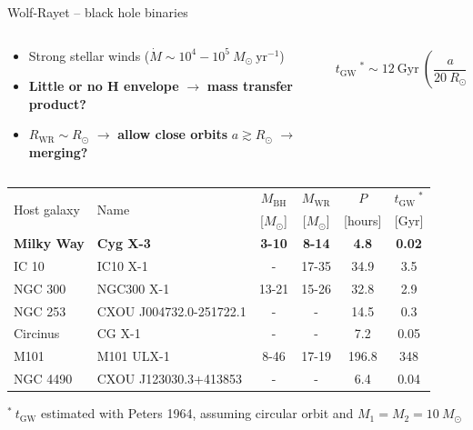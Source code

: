 \documentclass{beamer} %
\begin{document}
\begin{frame}{Wolf-Rayet -- black hole binaries}
	\scriptsize
	\begin{columns}
		\begin{column}{0.72\textwidth}
			\begin{itemize}
				\item Strong stellar winds ($\dot{M} \sim 10^4-10^5~M_\odot~\text{yr}^{-1}$)
				\item \textbf{Little or no H envelope} $\rightarrow$ \textbf{mass transfer product?}
				\item $R_{\text{WR}} \sim R_\odot$ $\rightarrow$ \textbf{allow close orbits} $a \gtrsim R_\odot$ $\rightarrow$ \textbf{merging?}
			\end{itemize}
		\end{column}
		\begin{column}{0.34\textwidth}
			\centering
			\[t_{\text{GW}}~^* \sim 12~\text{Gyr}~\left(\frac{a}{20~ R_\odot}\right)^4\]
		\end{column}
	\end{columns}
	\bigskip

	\centering
	\bigskip
	
	\begin{threeparttable}
	\begin{tabular}{llcccc}
		\toprule
		\multirow{2}{*}{Host galaxy} & \multirow{2}{*}{Name} & $M_{\text{BH}}$ & $M_{\text{WR}}$ & $P$ & $t_{\text{GW}}~^*$ \\
		& & [$M_\odot$] & [$M_\odot$] & [hours] & [Gyr] \\
		\midrule
		\textbf{Milky Way} & \textbf{Cyg X-3} & \textbf{3-10} & \textbf{8-14} & \textbf{4.8} & \textbf{0.02} \\
		IC 10 & IC10 X-1 & - & 17-35 & 34.9 & 3.5 \\
		NGC 300 & NGC300 X-1 & 13-21 & 15-26 & 32.8 & 2.9 \\
		NGC 253 & CXOU J004732.0-251722.1 & - & - & 14.5 & 0.3  \\
		Circinus & CG X-1 & - & - & 7.2  & 0.05 \\
		M101 & M101 ULX-1 & 8-46 & 17-19 & 196.8 & 348 \\
		NGC 4490 & CXOU J123030.3+413853 & - & - & 6.4 & 0.04 \\
		\bottomrule 	
	\end{tabular}
	\begin{tablenotes}[para]
	\tiny
	$^*~t_{\text{GW}}$ estimated with Peters 1964, assuming circular orbit and $M_1 = M_2 = 10~M_\odot$
	\end{tablenotes}
	\end{threeparttable}
	\flushright
	\vspace{-2mm}
\end{frame}
\end{document}
